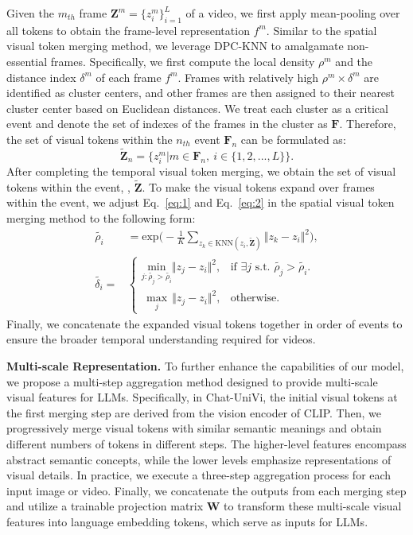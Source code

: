 \documentclass[10pt,twocolumn,letterpaper]{article}
\newcommand{\myparagraph}[1]{\textbf{#1}\hspace{1.8ex}}
\begin{document}
Given the $m_{th}$ frame $\bm{Z}^m=\{z_i^m\}_{i=1}^{L}$ of a video, we first apply mean-pooling over all tokens to obtain the frame-level representation $f^m$. Similar to the spatial visual token merging method, we leverage DPC-KNN to amalgamate non-essential frames. Specifically, we first compute the local density $\rho^m$ and the distance index $\delta^m$ of each frame $f^{m}$. Frames with relatively high $\rho^m \times \delta^m$ are identified as cluster centers, and other frames are then assigned to their nearest cluster center based on Euclidean distances. We treat each cluster as a critical event and denote the set of indexes of the frames in the cluster as $\bm{F}$. Therefore, the set of visual tokens within the $n_{th}$ event $\bm{F}_{n}$ can be formulated as:
\begin{equation}
\tilde{\bm{Z}}_{n}=\big\{z_i^m| m \in \bm{F}_n,\ i \in \{1,2,...,L\}\big\}.
\end{equation}
After completing the temporal visual token merging, we obtain the set of visual tokens within the event, \ie, $\tilde{\bm{Z}}$. To make the visual tokens expand over frames within the event, we adjust Eq.~\ref{eq:1} and Eq.~\ref{eq:2} in the spatial visual token merging method to the following form:
\begin{equation}
\begin{aligned}
\tilde{\rho_i}&=\textrm{exp}\big(-\frac{1}{K}\sum_{z_{k} \in \textrm{KNN}(z_{i}, \tilde{\bm{Z}})}\Vert z_{k}-z_{i} \Vert^2\big),\\
\tilde{\delta_i}=&
\begin{cases}
\underset{j:\tilde{\rho_j}>\tilde{\rho_i}}{\textrm{min}} \Vert z_{j}-z_{i} \Vert^2, & \text{if\ $\exists j$\ s.t.\ $\tilde{\rho_j}>\tilde{\rho_i}$.}\\
\ \ \underset{j}{\textrm{max}} \ \ \Vert z_{j}-z_{i} \Vert^2, & \text{otherwise.}
\end{cases}
\end{aligned}
\end{equation}
Finally, we concatenate the expanded visual tokens together in order of events to ensure the broader temporal understanding required for videos.

\noindent \myparagraph{Multi-scale Representation.} 
To further enhance the capabilities of our model, we propose a multi-step aggregation method designed to provide multi-scale visual features for LLMs. Specifically, in Chat-UniVi, the initial visual tokens at the first merging step are derived from the vision encoder of CLIP. Then, we progressively merge visual tokens with similar semantic meanings and obtain different numbers of tokens in different steps. The higher-level features encompass abstract semantic concepts, while the lower levels emphasize representations of visual details. In practice, we execute a three-step aggregation process for each input image or video. Finally, we concatenate the outputs from each merging step and utilize a trainable projection matrix $\bm{W}$ to transform these multi-scale visual features into language embedding tokens, which serve as inputs for LLMs.
\end{document}
